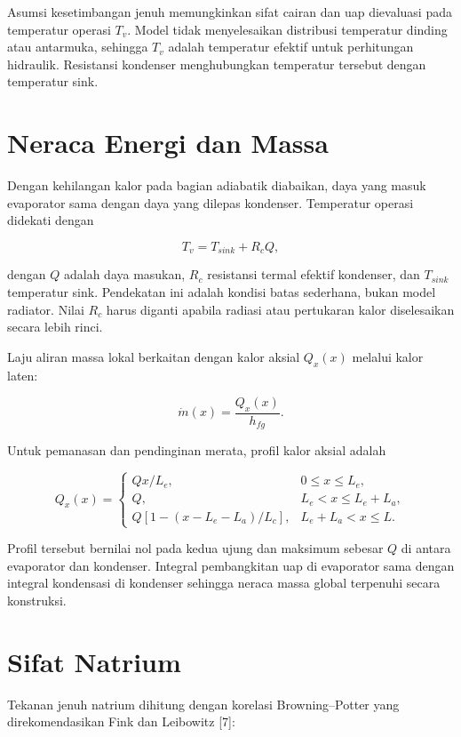 \documentclass[
  12pt,
  12pt,a4paper,oneside]{report}
\begin{document}
Asumsi kesetimbangan jenuh memungkinkan sifat cairan dan uap dievaluasi
pada temperatur operasi \(T_v\). Model tidak menyelesaikan distribusi
temperatur dinding atau antarmuka, sehingga \(T_v\) adalah temperatur
efektif untuk perhitungan hidraulik. Resistansi kondenser menghubungkan
temperatur tersebut dengan temperatur sink.

\hypertarget{neraca-energi-dan-massa}{%
\section{Neraca Energi dan Massa}\label{neraca-energi-dan-massa}}

Dengan kehilangan kalor pada bagian adiabatik diabaikan, daya yang masuk
evaporator sama dengan daya yang dilepas kondenser. Temperatur operasi
didekati dengan

\[
T_v=T_{sink}+R_cQ,
\tag{3.1}\]

dengan \(Q\) adalah daya masukan, \(R_c\) resistansi termal efektif
kondenser, dan \(T_{sink}\) temperatur sink. Pendekatan ini adalah
kondisi batas sederhana, bukan model radiator. Nilai \(R_c\) harus
diganti apabila radiasi atau pertukaran kalor diselesaikan secara lebih
rinci.

Laju aliran massa lokal berkaitan dengan kalor aksial \(Q_x(x)\) melalui
kalor laten:

\[
\dot m(x)=\frac{Q_x(x)}{h_{fg}}.
\tag{3.2}\]

Untuk pemanasan dan pendinginan merata, profil kalor aksial adalah

\[
Q_x(x)=
\begin{cases}
Q x/L_e, & 0\leq x\leq L_e,\\
Q, & L_e<x\leq L_e+L_a,\\
Q\left[1-(x-L_e-L_a)/L_c\right], & L_e+L_a<x\leq L.
\end{cases}
\tag{3.3}\]

Profil tersebut bernilai nol pada kedua ujung dan maksimum sebesar \(Q\)
di antara evaporator dan kondenser. Integral pembangkitan uap di
evaporator sama dengan integral kondensasi di kondenser sehingga neraca
massa global terpenuhi secara konstruksi.

\hypertarget{sifat-natrium}{%
\section{Sifat Natrium}\label{sifat-natrium}}

Tekanan jenuh natrium dihitung dengan korelasi Browning--Potter yang
direkomendasikan Fink dan Leibowitz {[}7{]}:
\end{document}
